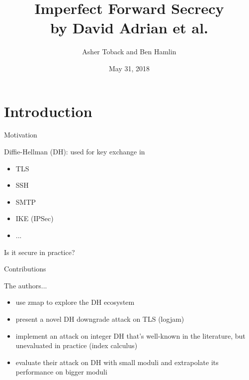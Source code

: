 \documentclass[presentation, aspectratio=54]{beamer}
\author{Asher Toback and Ben Hamlin}
\date{May 31, 2018}
\title{Imperfect Forward Secrecy \\ by David Adrian et al.}
\begin{document}
\maketitle

\section{Introduction}


\begin{frame}{Motivation}

Diffie-Hellman (DH): used for key exchange in
\begin{itemize}
\item TLS
\item SSH
\item SMTP
\item IKE (IPSec)
\item ...
\end{itemize}
\pause
\vspace{20pt}
Is it secure in practice?

\end{frame}


\begin{frame}{Contributions}

The authors...
\begin{itemize}
\item use zmap to explore the DH ecosystem
\item present a novel DH downgrade attack on TLS (logjam)
\item implement an attack on integer DH that's well-known in the literature, but
      unevaluated in practice (index calculus)
\item evaluate their attack on DH with small moduli and extrapolate its
      performance on bigger moduli
\end{itemize}

\end{frame}

\end{document}
